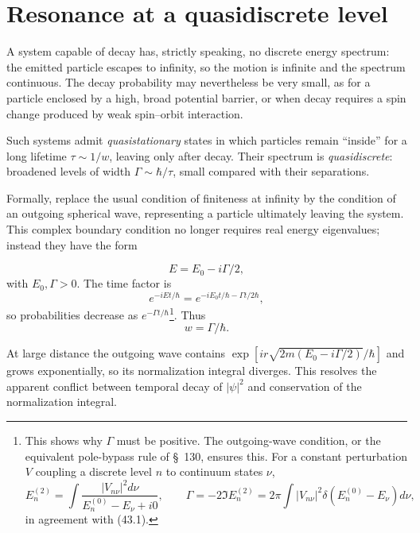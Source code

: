 \section{Resonance at a quasidiscrete level}

A system capable of decay has, strictly speaking, no discrete energy spectrum:
the emitted particle escapes to infinity, so the motion is infinite and the
spectrum continuous. The decay probability may nevertheless be very small,
as for a particle enclosed by a high, broad potential barrier, or when decay
requires a spin change produced by weak spin--orbit interaction.

Such systems admit \emph{quasistationary} states in which particles remain
``inside'' for a long lifetime $\tau\sim1/w$, leaving only after decay. Their
spectrum is \emph{quasidiscrete}: broadened levels of width $\Gamma\sim
\hbar/\tau$, small compared with their separations.

Formally, replace the usual condition of finiteness at infinity by the
condition of an outgoing spherical wave, representing a particle ultimately
leaving the system. This complex boundary condition no longer requires real
energy eigenvalues; instead they have the form

\begin{equation} E=E_0-i\Gamma/2, \tag{134.1}\end{equation}
with $E_0,\Gamma>0$. The time factor is
\[
 e^{-iEt/\hbar}=e^{-iE_0t/\hbar-\Gamma t/2\hbar},
\]
so probabilities decrease as $e^{-\Gamma t/\hbar}$\footnote{This shows why
$\Gamma$ must be positive. The outgoing-wave condition, or the equivalent
pole-bypass rule of \S~130, ensures this. For a constant perturbation $V$
coupling a discrete level $n$ to continuum states $\nu$,
\[
 E_n^{(2)}=\int\frac{|V_{n\nu}|^2d\nu}{E_n^{(0)}-E_\nu+i0},\qquad
 \Gamma=-2\Im E_n^{(2)}=2\pi\int|V_{n\nu}|^2
 \delta(E_n^{(0)}-E_\nu)d\nu,
\]
in agreement with (43.1).}. Thus
\begin{equation} w=\Gamma/\hbar. \tag{134.2}\end{equation}

At large distance the outgoing wave contains
$\exp[ir\sqrt{2m(E_0-i\Gamma/2)}/\hbar]$ and grows exponentially, so its
normalization integral diverges. This resolves the apparent conflict between
temporal decay of $|\psi|^2$ and conservation of the normalization integral.

